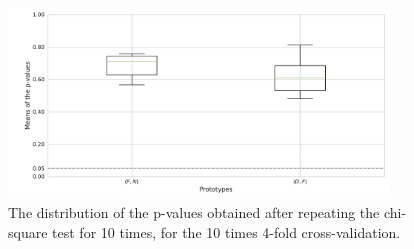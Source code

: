 \begin{figure}[!t]
	\centering
	\includegraphics[width=0.9\textwidth]{chapters/data-centric/supervised/img/10_times_4_folds_cv.pdf}
	\caption{The distribution of the p-values obtained after repeating the chi-square test for 10 times, for the 10 times 4-fold cross-validation.}
	\label{effective-fig:10-times-4-cv}
\end{figure}

